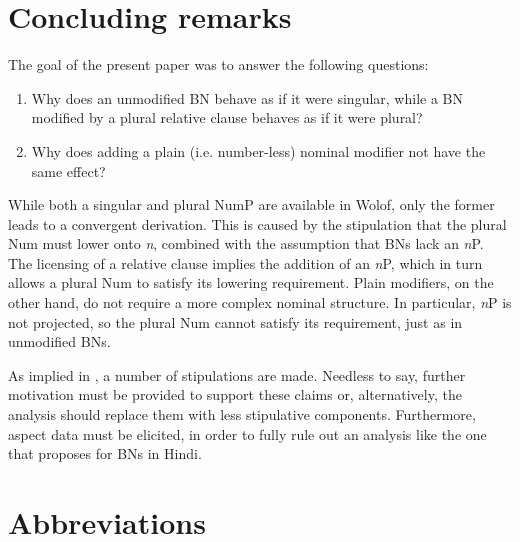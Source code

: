 \documentclass[output=paper]{langscibook}
\begin{document}
	\ea
	    \z
	\z

\section{Concluding remarks}

The goal of the present paper was to answer the following questions:

	
	\begin{enumerate}
	    \item Why does an unmodified BN behave as if it were singular, while a BN modified by a plural relative clause behaves as if it were plural?
        \item Why does adding a plain (i.e. number-less) nominal modifier not have the same effect?
	\end{enumerate}

\noindent   While both a singular and plural NumP are available in Wolof, only the former leads to a convergent derivation. This is caused by the stipulation that the plural Num must lower onto \textit{n}, combined with the assumption that BNs lack an \textit{n}P. The licensing of a relative clause implies the addition of an \textit{n}P, which in turn allows a plural Num to satisfy its lowering requirement. Plain modifiers, on the other hand, do not require a more complex nominal structure. In particular, \textit{n}P is not projected, so the plural Num cannot satisfy its requirement, just as in unmodified BNs.

As implied in , a number of stipulations are made. Needless to say, further motivation must be provided to support these claims or, alternatively, the analysis should replace them with less stipulative components. Furthermore, aspect data must be elicited, in order to fully rule out an analysis like the one that \citet{dayal2011hindi} proposes for BNs in Hindi.

\section*{Abbreviations}
\end{document}
